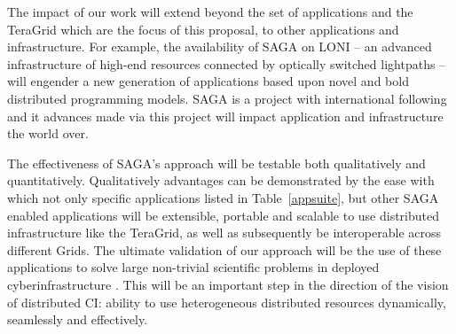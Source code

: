 \documentclass[10pt,letterpaper]{article}
\begin{document}

The impact of our work will extend beyond the set of applications and
the TeraGrid which are the focus of this proposal, to other
applications and infrastructure.  For example, the availability of
SAGA on LONI -- an advanced infrastructure of high-end resources
connected by optically switched lightpaths -- will engender a new
generation of applications based upon novel and bold distributed
programming models. SAGA is a project with international following and
it advances made via this project will impact application and
infrastructure the world over.



 The effectiveness of SAGA's approach will be testable
both qualitatively and quantitatively.  Qualitatively advantages can
be demonstrated by the ease with which not only specific applications
listed in Table~\ref{appsuite}, but other SAGA enabled applications
will be extensible, portable and scalable to use distributed
infrastructure like the TeraGrid, as well as subsequently be
interoperable across different Grids.  The ultimate validation of our
approach will be the  use of these applications to solve
large non-trivial scientific problems in deployed cyberinfrastructure
.  This will
be an important step in the direction of the vision of distributed CI:
ability to use heterogeneous distributed resources dynamically,
seamlessly and effectively.
\end{document}
